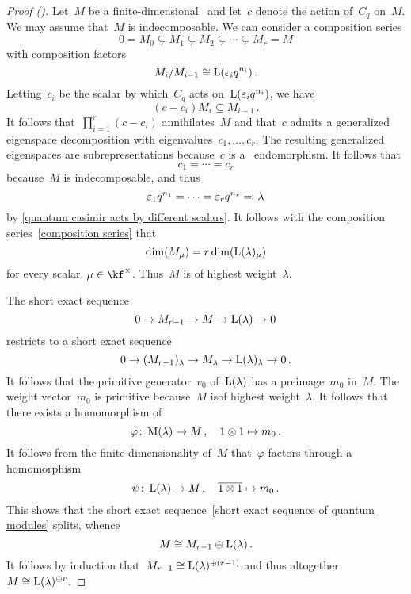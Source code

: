 \documentclass[a4paper, 11pt, oneside]{scrartcl}
\begin{document}
\begin{proof}[Proof ({\cite[Theorem~2.9]{jantzen_quantum}})]
  Let~$M$ be a finite-dimensional~ and let~$c$ denote the action of~$C_q$ on~$M$.
  We may assume that~$M$ is indecomposable.
  We can consider a composition series
  \begin{equation}
    \label{composition series}
    0
    =
    M_0
    \subsetneq
    M_1
    \subsetneq
    M_2
    \subsetneq
    \dotsb
    \subsetneq
    M_r
    =
    M
  \end{equation}
  with composition factors
  \[
    M_i/M_{i-1}
    \cong
    \operatorname{L}(\varepsilon_i q^{n_i}) \,.
  \]
  Letting~$c_i$ be the scalar by which~$C_q$ acts on~$\operatorname{L}(\varepsilon_i q^{n_i})$, we have
  \[
    (c - c_i) M_i \subseteq M_{i-1} \,.
  \]
  It follows that~$\prod_{i=1}^r (c - c_i)$ annihilates~$M$ and that~$c$ admits a generalized eigenspace decomposition with eigenvalues~$c_1, \dotsc, c_r$.
  The resulting generalized eigenspaces are subrepresentations because~$c$ is a~ endomorphism.
  It follows that
  \[
    c_1 = \dotsb = c_r
  \]
  because~$M$ is indecomposable, and thus
  \[
    \varepsilon_1 q^{n_1}
    =
    \dotsb
    =
    \varepsilon_r q^{n_r}
    \eqqcolon
    \lambda
  \]
  by \cref{quantum casimir acts by different scalars}.
  It follows with the composition series~\eqref{composition series} that
  \[
    \dim( M_\mu )
    =
    r \dim( \operatorname{L}(\lambda)_\mu )
  \]
  for every scalar~$\mu \in \kf^\times$.
  Thus~$M$ is of highest weight~$\lambda$.

  The short exact sequence
  \begin{equation}
    \label{short exact sequence of quantum modules}
    0
    \to
    M_{r-1}
    \to
    M
    \to
    \operatorname{L}(\lambda)
    \to
    0
  \end{equation}
  restricts to a short exact sequence
  \[
    0
    \to
    ( M_{r-1} )_\lambda
    \to
    M_\lambda
    \to
    \operatorname{L}(\lambda)_\lambda
    \to
    0 \,.
  \]
  It follows that the primitive generator~$v_0$ of~$\operatorname{L}(\lambda)$ has a preimage~$m_0$ in~$M$.
  The weight vector~$m_0$ is primitive because~$M$ isof highest weight~$\lambda$.
  It follows that there exists a homomorphism of~
  \[
    \varphi
    \colon
    \operatorname{M}(\lambda)
    \to
    M
    \,,
    \quad
    1 \otimes 1
    \mapsto
    m_0 \,.
  \]
  It follows from the finite-dimensionality of~$M$ that~$\varphi$ factors through a homomorphism
  \[
    \psi
    \colon
    \operatorname{L}(\lambda)
    \to
    M
    \,,
    \quad
    \overline{1 \otimes 1}
    \mapsto
    m_0 \,.
  \]
  This shows that the short exact sequence~\eqref{short exact sequence of quantum modules} splits, whence
  \[
    M \cong M_{r-1} \oplus \operatorname{L}(\lambda) \,.
  \]
  It follows by induction that~$M_{r-1} \cong \operatorname{L}(\lambda)^{\oplus (r-1)}$ and thus altogether~$M \cong \operatorname{L}(\lambda)^{\oplus r}$.
\end{proof}
\end{document}
